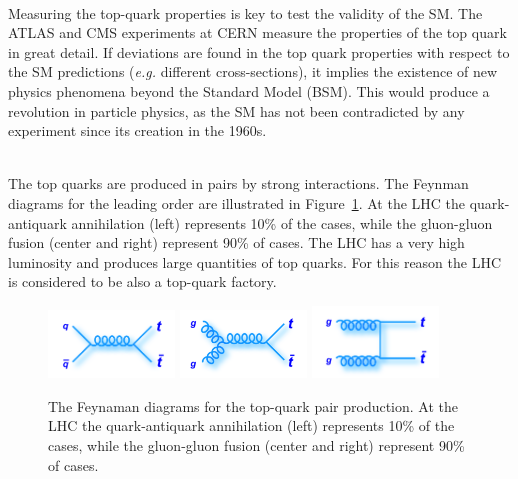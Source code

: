 \ \\Measuring the top-quark properties is key to test the validity of the SM. The ATLAS and CMS experiments at CERN measure the properties of the top quark in great detail. If deviations are found in the top quark properties with respect to the SM predictions (\emph{e.g.} different cross-sections), it implies the existence of new physics phenomena beyond the Standard Model (BSM). This would produce a revolution in particle physics, as the SM has not been contradicted by any experiment since its creation in the 1960s. 

\ \\The top quarks are produced in pairs by strong interactions. The Feynman diagrams for the leading order are illustrated in Figure~\ref{fig:TopQuarkFeynmanDiagrams}. At the LHC the quark-antiquark annihilation (left) represents 10\% of the cases, while the gluon-gluon fusion (center and right) represent 90\% of cases. The LHC has a very high luminosity and produces large quantities of top quarks. For this reason the LHC is considered to be also a top-quark factory.

\begin{figure}[h]
  \centering
  \includegraphics[width=0.3\textwidth]{../presentation/plots/ttbar_1.png}
  \includegraphics[width=0.3\textwidth]{../presentation/plots/ttbar_2.png}
  \includegraphics[width=0.3\textwidth]{../presentation/plots/ttbar_3.png}
  \caption{The Feynaman diagrams for the top-quark pair production. At the LHC the quark-antiquark annihilation (left) represents 10\% of the cases, while the gluon-gluon fusion (center and right) represent 90\% of cases.}
  \label{fig:TopQuarkFeynmanDiagrams}
\end{figure}

